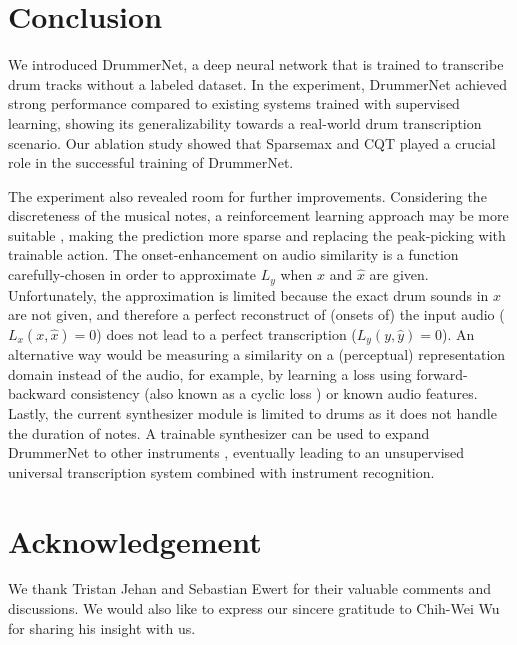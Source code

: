 \documentclass{article}
\begin{document}
	\section{Conclusion} \label{sec:conclusion}
	We introduced DrummerNet, a deep neural network that is trained to transcribe drum tracks without a labeled dataset. In the experiment, DrummerNet achieved strong performance compared to existing systems trained with supervised learning, showing its generalizability towards a real-world drum transcription scenario. Our ablation study showed that Sparsemax and CQT played a crucial role in the successful training of DrummerNet.
	
	The experiment also revealed room for further improvements. Considering the discreteness of the musical notes, a reinforcement learning approach may be more suitable \cite{southall2018player}, making the prediction more sparse and replacing the peak-picking with trainable action. 
	The onset-enhancement on audio similarity is a function carefully-chosen in order to approximate $L_y$ when $x$ and $\hat{x}$ are given. Unfortunately, the approximation is limited because the exact drum sounds in $x$ are not given, and therefore a perfect reconstruct of (onsets of) the input audio ($L_x(x, \hat{x})=0$) does not lead to a perfect transcription ($L_y(y, \hat{y})=0$). An alternative way would be measuring a similarity on a (perceptual) representation domain instead of the audio, for example, by learning a loss using forward-backward consistency (also known as a cyclic loss \cite{kalal2010forward}) or known audio features.
	Lastly, the current synthesizer module is limited to drums as it does not handle the duration of notes. A trainable synthesizer can be used to expand DrummerNet to other instruments \cite{engel2017neural, blaauw2017neural}, eventually leading to an unsupervised universal transcription system combined with instrument recognition.
	
	\section{Acknowledgement}
	We thank Tristan Jehan and Sebastian Ewert for their valuable comments and discussions. We would also like to express our sincere gratitude to Chih-Wei Wu for sharing his insight with us. 
	
	
\end{document}
